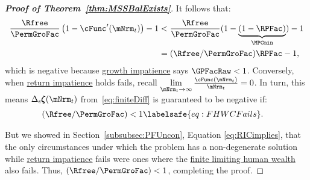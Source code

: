 \documentclass[\econtexRoot/BufferStockTheory]{subfiles}
\begin{document}
\begin{proof}[\textbf{Proof of Theorem~\ref{thm:MSSBalExists}}]
It follows that:
%
\begin{align*}
   \frac{\Rfree}{\PermGroFac}\left(1-\cFunc^{\prime}({\mNrm}_t)\right) - 1 & <   \frac{\Rfree}{\PermGroFac}(1-\underbrace{(1-\RPFac)}_{\MPCmin}) - 1  \\
                                                      & = (\Rfree/\PermGroFac)\RPFac - 1, 
\end{align*}
%
which is negative because \hyperlink{GIC}{growth impatience} says $\GPFacRaw < 1$.
Conversely, when \hyperlink{RIC}{return impatience} holds fails, recall $\lim\limits_{\mNrm_{t} \rightarrow \infty} \frac{\cFunc(\mNrm_{t})}{\mNrm_{t}} = 0$.
In turn, this means $\Delta_{\epsilon}\difFunc(\mNrm_{t})$ from~\eqref{eq:finiteDiff} is guaranteed to be negative if:
%
\begin{align}
  (\Rfree/\PermGroFac) & < 1  \labelsafe{eq:FHWCFails}.
\end{align}

But we showed in Section~\ref{subsubsec:PFUncon}, Equation \eqref{eq:RICimplies}, that the only circumstances under which the problem has a non-degenerate solution while \hyperlink{RIC}{return impatience} fails were ones where the \hyperlink{FHWC}{finite limiting human wealth} also fails.
Thus, $(\Rfree/\PermGroFac) < 1$, completing the proof.


\end{proof}
\end{document}
